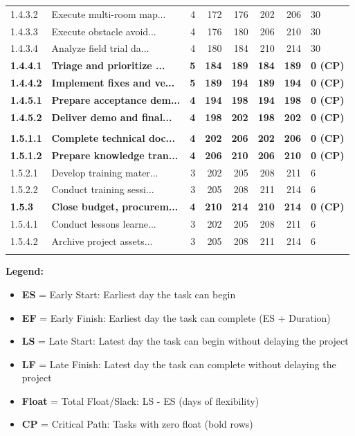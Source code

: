\begin{longtable}{@{}llrrrrrl@{}}
1.4.3.2 & Execute multi-room map... & 4 & 172 & 176 & 202 & 206 & 30 \\
1.4.3.3 & Execute obstacle avoid... & 4 & 176 & 180 & 206 & 210 & 30 \\
1.4.3.4 & Analyze field trial da... & 4 & 180 & 184 & 210 & 214 & 30 \\
\textbf{1.4.4.1} & \textbf{Triage and prioritize ...} & \textbf{5} & \textbf{184} & \textbf{189} & \textbf{184} & \textbf{189} & \textbf{0 (CP)} \\
\textbf{1.4.4.2} & \textbf{Implement fixes and ve...} & \textbf{5} & \textbf{189} & \textbf{194} & \textbf{189} & \textbf{194} & \textbf{0 (CP)} \\
\textbf{1.4.5.1} & \textbf{Prepare acceptance dem...} & \textbf{4} & \textbf{194} & \textbf{198} & \textbf{194} & \textbf{198} & \textbf{0 (CP)} \\
\textbf{1.4.5.2} & \textbf{Deliver demo and final...} & \textbf{4} & \textbf{198} & \textbf{202} & \textbf{198} & \textbf{202} & \textbf{0 (CP)} \\
\addlinespace
\multicolumn{8}{l}{\textbf{Close Phase}} \\
\addlinespace
\textbf{1.5.1.1} & \textbf{Complete technical doc...} & \textbf{4} & \textbf{202} & \textbf{206} & \textbf{202} & \textbf{206} & \textbf{0 (CP)} \\
\textbf{1.5.1.2} & \textbf{Prepare knowledge tran...} & \textbf{4} & \textbf{206} & \textbf{210} & \textbf{206} & \textbf{210} & \textbf{0 (CP)} \\
1.5.2.1 & Develop training mater... & 3 & 202 & 205 & 208 & 211 & 6 \\
1.5.2.2 & Conduct training sessi... & 3 & 205 & 208 & 211 & 214 & 6 \\
\textbf{1.5.3} & \textbf{Close budget, procurem...} & \textbf{4} & \textbf{210} & \textbf{214} & \textbf{210} & \textbf{214} & \textbf{0 (CP)} \\
1.5.4.1 & Conduct lessons learne... & 3 & 202 & 205 & 208 & 211 & 6 \\
1.5.4.2 & Archive project assets... & 3 & 205 & 208 & 211 & 214 & 6 \\
\addlinespace
\end{longtable}

\noindent\textbf{Legend:}
\begin{itemize}[nosep]
    \item \textbf{ES} = Early Start: Earliest day the task can begin
    \item \textbf{EF} = Early Finish: Earliest day the task can complete (ES + Duration)
    \item \textbf{LS} = Late Start: Latest day the task can begin without delaying the project
    \item \textbf{LF} = Late Finish: Latest day the task can complete without delaying the project
    \item \textbf{Float} = Total Float/Slack: LS - ES (days of flexibility)
    \item \textbf{CP} = Critical Path: Tasks with zero float (bold rows)
\end{itemize}
